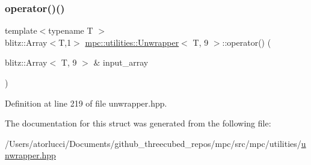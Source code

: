 \subsubsection{\texorpdfstring{operator()()}{operator()()}}
{\footnotesize\ttfamily template$<$typename T $>$ \\
blitz\+::\+Array$<$T,1$>$ \mbox{\hyperlink{structmpc_1_1utilities_1_1_unwrapper}{mpc\+::utilities\+::\+Unwrapper}}$<$ T, 9 $>$\+::operator() (\begin{DoxyParamCaption}\item[{blitz\+::\+Array$<$ T, 9 $>$ \&}]{input\+\_\+array }\end{DoxyParamCaption})\hspace{0.3cm}{\ttfamily [inline]}}



Definition at line 219 of file unwrapper.\+hpp.



The documentation for this struct was generated from the following file\+:\begin{DoxyCompactItemize}
\item 
/\+Users/atorlucci/\+Documents/github\+\_\+threecubed\+\_\+repos/mpc/src/mpc/utilities/\mbox{\hyperlink{unwrapper_8hpp}{unwrapper.\+hpp}}\end{DoxyCompactItemize}
